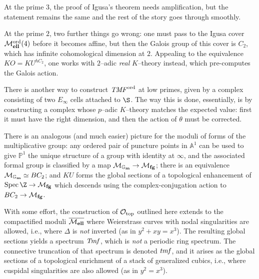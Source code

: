 \begin{remark}
At the prime \(3\), the proof of Igusa's theorem needs amplification, but the statement remains the same and the rest of the story goes through smoothly.
\end{remark}

\begin{remark}
At the prime \(2\), two further things go wrong: one must pass to the Igusa cover \(\mathcal{M}_{\mathbf{ell}}^{\mathrm{ord}}(4)\) before it becomes affine, but then the Galois group of this cover is \(C_2\), which has infinite cohomological dimension at \(2\).  Appealing to the equivalence \(KO = KU^{hC_2}\), one works with \(2\)--adic \emph{real} \(K\)--theory instead, which pre-computes the Galois action.
\end{remark}

\begin{remark}
There is another way to construct \(\mathit{TMF}^{\mathrm{ord}}\) at low primes, given by a complex consisting of two \(E_\infty\) cells attached to \(\S\).  The way this is done, essentially, is by constructing a complex whose \(p\)--adic \(K\)--theory matches the expected value: first it must have the right dimension, and then the action of \(\theta\) must be corrected.
\end{remark}

\begin{remark}
There is an analogous (and much easier) picture for the moduli of forms of the multiplicative group: any ordered pair of puncture points in \(\mathbb A^1\) can be used to give \(\mathbb P^1\) the unique structure of a group with identity at \(\infty\), and the associated formal group is classified by a map \(\mathcal{M}_{\mathbf{\mathbb G_m}} \to \mathcal{M}_{\mathbf{fg}}\); there is an equivalence \(\mathcal{M}_{\mathbf{\mathbb G_m}} \simeq BC_2\); and \(KU\) forms the global sections of a topological enhancement of \(\Spec \Z \to \moduli{fg}\) which descends using the complex-conjugation action to \(BC_2 \to \mathcal{M}_{\mathbf{fg}}\).
\end{remark}

\begin{remark}
With some effort, the construction of \(\mathcal{O}_{\mathrm{top}}\) outlined here extends to the compactified moduli \(\overline{\mathcal{M}_{\mathbf{ell}}}\) where Weierstrass curves with nodal singularities are allowed, i.e., where \(\Delta\) is \emph{not} inverted (as in \(y^2 + xy = x^3\)).  The resulting global sections yields a spectrum \(\mathit{Tmf}\), which is \emph{not} a periodic ring spectrum.  The connective truncation of that spectrum is denoted \(\mathit{tmf}\), and it arises as the global sections of a topological enrichment of a stack of generalized cubics, i.e., where cuspidal singularities are also allowed (as in \(y^2 = x^3\)).
\end{remark}

